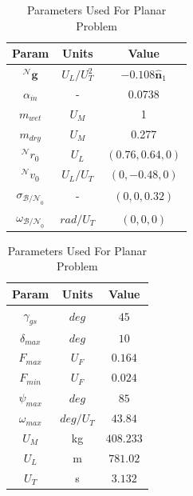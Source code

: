\documentclass[conf]{new-aiaa}
\begin{document}
\begin{table}[ht]
\caption{Parameters Used For Planar Problem}
\centering 
\begin{tabular}{c c c} 
\hline\hline
Param & Units & Value \\ [0.5ex] 
\hline 
$^\mathcal{N}\mathbf{g}$    & $U_L/U_T^2$   & $-0.108\hat{\mathbf{n}}_1$  \\ 
$\alpha_{\dot{m}}$        & -       & 0.0738  \\
$m_{wet}$             & $U_M$     & 1  \\
$m_{dry}$             & $U_M$     & 0.277  \\
$^\mathcal{N}r_{0}$       & $U_L$     & $(0.76,0.64,0)$  \\
$^\mathcal{N}v_{0}$       & $U_L/U_T$   & $(0,-0.48,0)$  \\
$\sigma_{\mathcal{B/N}_0}$    & -     & $(0,0,0.32)$  \\
$\omega_{\mathcal{B/N}_0}$    & $rad/U_T$   & $(0,0,0)$ \\[1ex] 
\hline
\end{tabular}
\begin{tabular}{c c c} 
\hline\hline
Param & Units & Value \\ [0.5ex] 
\hline 
$\gamma_{gs}$           & $deg$     & $45$  \\ 
$\delta_{max}$          & $deg$     & $10$  \\
$F_{max}$             & $U_F$     & $0.164$ \\
$F_{min}$             & $U_F$     & $0.024$  \\
$\psi_{max}$          & $deg$     & $85$  \\
$\omega_{max}$          & $deg/U_T$   & $43.84$  \\
$U_M$               & kg      & $408.233$  \\
$U_L$             & m       & $781.02$ \\
$U_T$             & s       & $3.132$ \\[1ex] 
\hline
\end{tabular}
\label{table:tableplanar}
\end{table}
\end{document}
